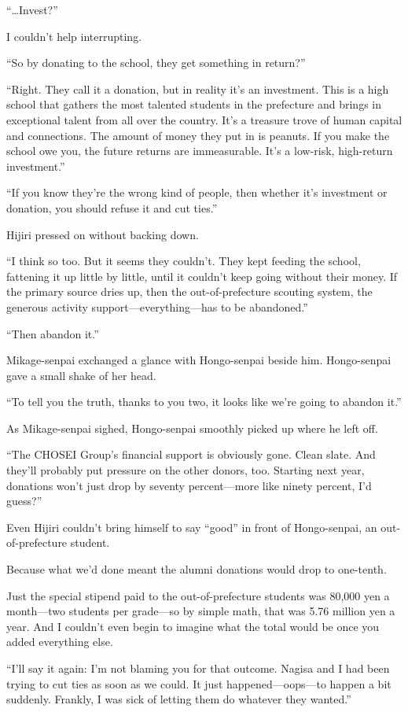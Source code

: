 \documentclass[
    a4paper,
    12pt,
    twoside,
    openany,
    UTF8,
    fontset=windows
]{ctexbook}
\begin{document}
``\dots Invest?''

I couldn't help interrupting.

``So by donating to the school, they get something in return?''

``Right. They call it a donation, but in reality it's an investment. This is a high school that gathers the most talented students in the prefecture and brings in exceptional talent from all over the country. It's a treasure trove of human capital and connections. The amount of money they put in is peanuts. If you make the school owe you, the future returns are immeasurable. It's a low-risk, high-return investment.''

``If you know they're the wrong kind of people, then whether it's investment or donation, you should refuse it and cut ties.''

Hijiri pressed on without backing down.

``I think so too. But it seems they couldn't. They kept feeding the school, fattening it up little by little, until it couldn't keep going without their money. If the primary source dries up, then the out-of-prefecture scouting system, the generous activity support---everything---has to be abandoned.''

``Then abandon it.''

Mikage-senpai exchanged a glance with Hongo-senpai beside him. Hongo-senpai gave a small shake of her head.

``To tell you the truth, thanks to you two, it looks like we're going to abandon it.''

As Mikage-senpai sighed, Hongo-senpai smoothly picked up where he left off.

``The CHOSEI Group's financial support is obviously gone. Clean slate. And they'll probably put pressure on the other donors, too. Starting next year, donations won't just drop by seventy percent---more like ninety percent, I'd guess?''

Even Hijiri couldn't bring himself to say ``good'' in front of Hongo-senpai, an out-of-prefecture student.

Because what we'd done meant the alumni donations would drop to one-tenth.

Just the special stipend paid to the out-of-prefecture students was 80,000 yen a month---two students per grade---so by simple math, that was 5.76 million yen a year. And I couldn't even begin to imagine what the total would be once you added everything else.

``I'll say it again: I'm not blaming you for that outcome. Nagisa and I had been trying to cut ties as soon as we could. It just happened---oops---to happen a bit suddenly. Frankly, I was sick of letting them do whatever they wanted.''
\end{document}

